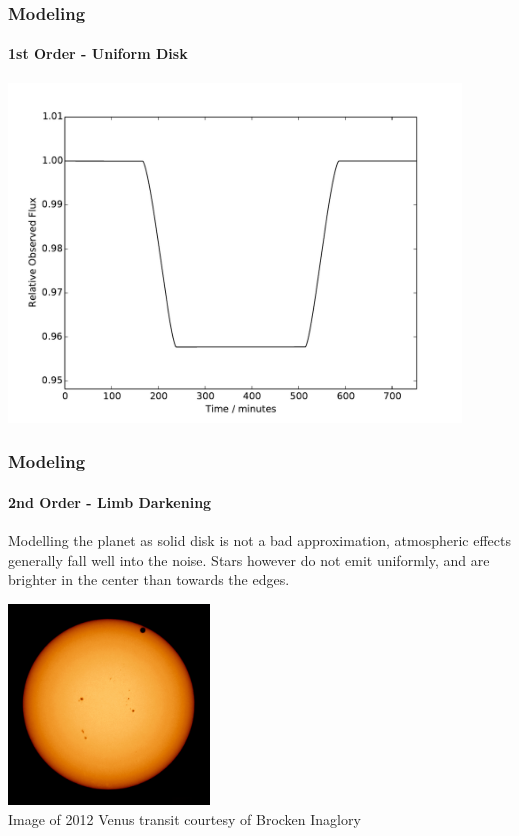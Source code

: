\documentclass{beamer}
\begin{document}
  \begin{frame}
  \frametitle{Modeling}
    \framesubtitle{1st Order - Uniform Disk}
    \begin{center}
    \includegraphics[width=0.9\textwidth]{images/uniform_disk_model.pdf}
    \end{center}
  \end{frame}
  \begin{frame}
  \frametitle{Modeling}
    \framesubtitle{2nd Order - Limb Darkening}
    Modelling the planet as solid disk is not a bad approximation, atmospheric effects generally fall well into the noise.
    Stars however do not emit uniformly, and are brighter in the center than towards the edges.
    \begin{center}
    \includegraphics[width=0.4\textwidth]{images/venus_transit.jpg}
    {\tiny\\
    Image of 2012 Venus transit courtesy of Brocken Inaglory}
    \end{center}
  \end{frame}
\end{document}
